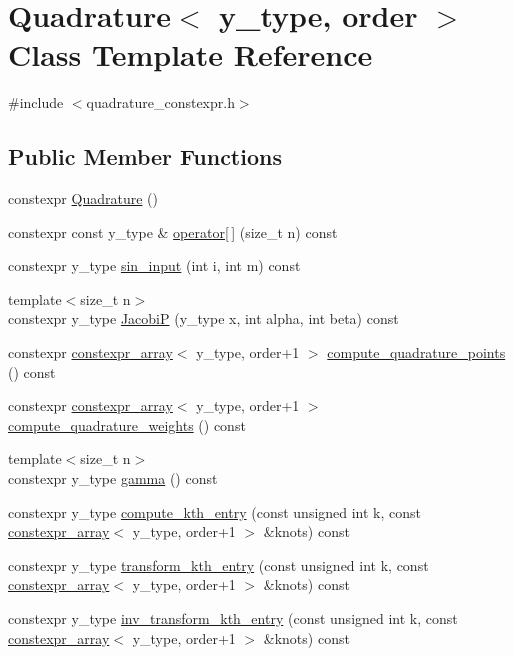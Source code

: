 \hypertarget{class_quadrature}{}\section{Quadrature$<$ y\+\_\+type, order $>$ Class Template Reference}
\label{class_quadrature}


{\ttfamily \#include $<$quadrature\+\_\+constexpr.\+h$>$}

\subsection*{Public Member Functions}
\begin{DoxyCompactItemize}
\item 
constexpr \hyperlink{class_quadrature_a0856d3ef4be07d572fd94d34f60ae6cb}{Quadrature} ()
\item 
constexpr const y\+\_\+type \& \hyperlink{class_quadrature_a99f64a4cef3011cbf0df06a4e8eec0c0}{operator\mbox{[}$\,$\mbox{]}} (size\+\_\+t n) const
\item 
constexpr y\+\_\+type \hyperlink{class_quadrature_a58f654e4f2cc08855dfed52d65b35c04}{sin\+\_\+input} (int i, int m) const
\item 
{\footnotesize template$<$size\+\_\+t n$>$ }\\constexpr y\+\_\+type \hyperlink{class_quadrature_a14035efb920cf6ab00fae290e5bbe4bf}{JacobiP} (y\+\_\+type x, int alpha, int beta) const
\item 
constexpr \hyperlink{classconstexpr__array}{constexpr\+\_\+array}$<$ y\+\_\+type, order+1 $>$ \hyperlink{class_quadrature_a9c99c8f4086eec3e94e0eae8a50506ff}{compute\+\_\+quadrature\+\_\+points} () const
\item 
constexpr \hyperlink{classconstexpr__array}{constexpr\+\_\+array}$<$ y\+\_\+type, order+1 $>$ \hyperlink{class_quadrature_a904e3b1cad3b304b500701354b30e194}{compute\+\_\+quadrature\+\_\+weights} () const
\item 
{\footnotesize template$<$size\+\_\+t n$>$ }\\constexpr y\+\_\+type \hyperlink{class_quadrature_ad361ff7a9bfdb5721a107341abfb37d4}{gamma} () const
\item 
constexpr y\+\_\+type \hyperlink{class_quadrature_a924d121900f371d20e84fb3d5277ba4d}{compute\+\_\+kth\+\_\+entry} (const unsigned int k, const \hyperlink{classconstexpr__array}{constexpr\+\_\+array}$<$ y\+\_\+type, order+1 $>$ \&knots) const
\item 
constexpr y\+\_\+type \hyperlink{class_quadrature_a760b6b2c4560afa7218533136a00d0ed}{transform\+\_\+kth\+\_\+entry} (const unsigned int k, const \hyperlink{classconstexpr__array}{constexpr\+\_\+array}$<$ y\+\_\+type, order+1 $>$ \&knots) const
\item 
constexpr y\+\_\+type \hyperlink{class_quadrature_a98b32f58c1a69d2430e2ed14283b07e9}{inv\+\_\+transform\+\_\+kth\+\_\+entry} (const unsigned int k, const \hyperlink{classconstexpr__array}{constexpr\+\_\+array}$<$ y\+\_\+type, order+1 $>$ \&knots) const
\end{DoxyCompactItemize}
